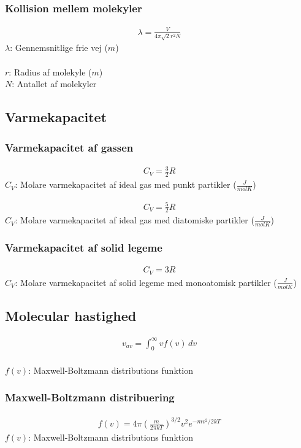 	\subsubsection{Kollision mellem molekyler}
		\begin{align}
			\lambda=\frac{V}{4\pi\sqrt{2}r^2N}
		\end{align}
		$\lambda$: Gennemsnitlige frie vej ($m$)\\
		\volumen\\
		$r$: Radius af molekyle ($m$)\\
		$N$: Antallet af molekyler\\

\subsection{Varmekapacitet}
	\subsubsection{Varmekapacitet af gassen}
		\begin{align}
			C_V=\frac{3}{2}R
		\end{align}
		$C_V$: Molare varmekapacitet af ideal gas med punkt partikler ($\frac{J}{mol K}$)\\
		\idealgaskonst

		\begin{align}
			C_V=\frac{5}{2}R
		\end{align}
		$C_V$: Molare varmekapacitet af ideal gas med diatomiske partikler ($\frac{J}{mol K}$)\\
		\idealgaskonst
	
	\subsubsection{Varmekapacitet af solid legeme}
		\begin{align}
			C_V=3R
		\end{align}
		$C_V$: Molare varmekapacitet af solid legeme med monoatomisk partikler ($\frac{J}{mol K}$)\\
		\idealgaskonst

\subsection{Molecular hastighed}
	\begin{align}
		v_{av}=\int_0^{\infty}vf(v)\,dv
	\end{align}
	\vel\\
	$f(v)$: Maxwell-Boltzmann distributions funktion

	\subsubsection{Maxwell-Boltzmann distribuering}
		\begin{align}
			f(v)=4\pi(\frac{m}{2\pi kT})^{3/2}v^2e^{-mv^2/2kT}
		\end{align}
		$f(v)$: Maxwell-Boltzmann distributions funktion\\
		\masse\\
		\boltzkonst\\
		\tempk\\
		\vel
